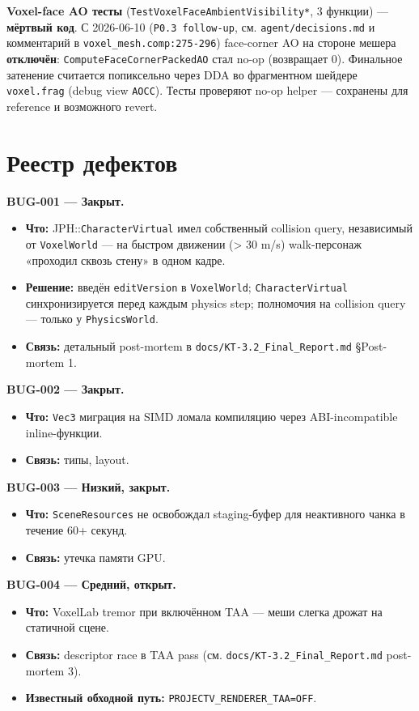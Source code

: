 \documentclass[
  11pt,a4paper,oneside]{article}
\providecommand{\tightlist}{%
  \setlength{\itemsep}{0pt}\setlength{\parskip}{0pt}}
\providecommand{\tightlist}{%
  \setlength{\itemsep}{0pt}\setlength{\parskip}{0pt}}
\begin{document}
\textbf{Voxel-face AO тесты} (\texttt{TestVoxelFaceAmbientVisibility*}, 3 функции) --- \textbf{мёртвый код}. С 2026-06-10 (\texttt{P0.3\ follow-up}, см. \texttt{agent/decisions.md} и комментарий в \texttt{voxel\_mesh.comp:275-296}) face-corner AO на стороне мешера \textbf{отключён}: \texttt{ComputeFaceCornerPackedAO} стал no-op (возвращает 0). Финальное затенение считается попиксельно через DDA во фрагментном шейдере \texttt{voxel.frag} (debug view \texttt{AOCC}). Тесты проверяют no-op helper --- сохранены для reference и возможного revert.

\section{Реестр дефектов}\label{ux440ux435ux435ux441ux442ux440-ux434ux435ux444ux435ux43aux442ux43eux432}

\textbf{BUG-001 --- Закрыт.}

\begin{itemize}
\tightlist
\item
  \textbf{Что:} JPH::\texttt{CharacterVirtual} имел собственный collision query, независимый от \texttt{VoxelWorld} --- на быстром движении (\textgreater{} 30 m/s) walk-персонаж «проходил сквозь стену» в одном кадре.
\item
  \textbf{Решение:} введён \texttt{editVersion} в \texttt{VoxelWorld}; \texttt{CharacterVirtual} синхронизируется перед каждым physics step; полномочия на collision query --- только у \texttt{PhysicsWorld}.
\item
  \textbf{Связь:} детальный post-mortem в \texttt{docs/KT-3.2\_Final\_Report.md} §Post-mortem 1.
\end{itemize}

\textbf{BUG-002 --- Закрыт.}

\begin{itemize}
\tightlist
\item
  \textbf{Что:} \texttt{Vec3} миграция на SIMD ломала компиляцию через ABI-incompatible inline-функции.
\item
  \textbf{Связь:} типы, layout.
\end{itemize}

\textbf{BUG-003 --- Низкий, закрыт.}

\begin{itemize}
\tightlist
\item
  \textbf{Что:} \texttt{SceneResources} не освобождал staging-буфер для неактивного чанка в течение 60+ секунд.
\item
  \textbf{Связь:} утечка памяти GPU.
\end{itemize}

\textbf{BUG-004 --- Средний, открыт.}

\begin{itemize}
\tightlist
\item
  \textbf{Что:} VoxelLab tremor при включённом TAA --- меши слегка дрожат на статичной сцене.
\item
  \textbf{Связь:} descriptor race в TAA pass (см. \texttt{docs/KT-3.2\_Final\_Report.md} post-mortem 3).
\item
  \textbf{Известный обходной путь:} \texttt{PROJECTV\_RENDERER\_TAA=OFF}.
\end{itemize}
\end{document}
